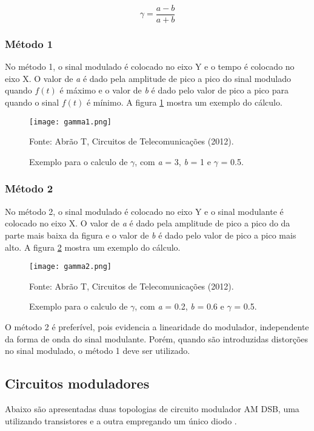 \begin{equation}
\gamma = \frac{a - b}{a + b}
\label{e_gamma}
\end{equation}

\subsubsection{Método 1}
No método 1, o sinal modulado é colocado no eixo Y e o tempo é colocado no eixo X. O valor de \textit{a} é dado pela amplitude de pico a pico do sinal modulado quando $f(t)$ é máximo e o valor de \textit{b} é dado pelo valor de pico a pico para quando o sinal  $f(t)$ é mínimo. A figura \ref{f_gamma1} mostra um exemplo do cálculo.

\begin{figure}[H]
    \centering
    \caption{Exemplo para o calculo de $\gamma$, com \textit{a} = 3, \textit{b} = 1 e $\gamma$ = 0.5.}
    \texttt{[image: gamma1.png]}
    \label{f_gamma1}
    
    \small Fonte: Abrão T, Circuitos de Telecomunicações (2012).
\end{figure}

\subsubsection{Método 2}

No método 2, o sinal modulado é colocado no eixo Y e o sinal modulante é colocado no eixo X. O valor de \textit{a} é dado pela amplitude de pico a pico do da parte mais baixa da figura e o valor de \textit{b} é dado pelo valor de pico a pico mais alto. A figura \ref{f_gamma2} mostra um exemplo do cálculo.

\begin{figure}[H]
    \centering
    \caption{Exemplo para o calculo de $\gamma$, com \textit{a} = 0.2, \textit{b} = 0.6 e $\gamma$ = 0.5.}
    \texttt{[image: gamma2.png]}
    \label{f_gamma2}
    
    \small Fonte: Abrão T, Circuitos de Telecomunicações (2012).
\end{figure}

O método 2 é preferível, pois evidencia a linearidade do modulador, independente da forma de onda do sinal modulante. Porém, quando são introduzidas distorções no sinal modulado, o método 1 deve ser utilizado.

\subsection{Circuitos moduladores}
Abaixo são apresentadas duas topologias de circuito modulador AM DSB, uma utilizando transistores e a outra empregando um único diodo \cite{Rhea}.

